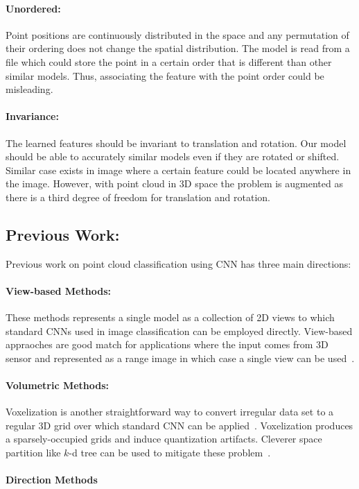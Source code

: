 \paragraph{Unordered:} Point positions are continuously distributed in the space and any permutation of their ordering does not change the spatial distribution. The model is read from a file which could store the point in a certain order that is different than other similar models. Thus, associating the feature with the point order could be misleading.
\paragraph{Invariance:} The learned features should be invariant to translation and rotation. Our model should be able to accurately similar models even if they are rotated or shifted. Similar case exists in image where a certain feature could be located anywhere in the image. However, with point cloud in 3D space the problem is augmented as there is a third degree of freedom for translation and rotation. 



\subsection{Previous Work:}
Previous work on point cloud classification using CNN has three main directions:
\paragraph{View-based Methods:}
These methods represents a single model as a collection of 2D views to which standard CNNs used in image classification can be employed directly. View-based appraoches are good match for applications where the input comes from 3D sensor and represented as a range image in which case a single view can be used~\citep{wei2016dense}. 

\paragraph{Volumetric Methods:}
Voxelization is another straightforward way to convert irregular data set to a regular 3D grid over which standard CNN can be applied~\citep{maturana2015voxnet}. Voxelization produces a sparsely-occupied grids and induce quantization artifacts. Cleverer space partition like $k$-d tree can be used to mitigate these problem~\citep{klokov2017escape}.
\paragraph{Direction Methods}
